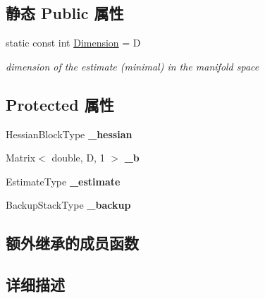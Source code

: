 \subsection*{静态 Public 属性}
\begin{DoxyCompactItemize}
\item 
\hypertarget{classg2o_1_1BaseVertex_a9a831bfdf84cfe625d8f942bc4f1c2d1}{static const int \hyperlink{classg2o_1_1BaseVertex_a9a831bfdf84cfe625d8f942bc4f1c2d1}{Dimension} = D}\label{classg2o_1_1BaseVertex_a9a831bfdf84cfe625d8f942bc4f1c2d1}

\begin{DoxyCompactList}\small\item\em dimension of the estimate (minimal) in the manifold space \end{DoxyCompactList}\end{DoxyCompactItemize}
\subsection*{Protected 属性}
\begin{DoxyCompactItemize}
\item 
\hypertarget{classg2o_1_1BaseVertex_afaf73b0e874db76655d90bdb2f156c00}{Hessian\-Block\-Type {\bfseries \-\_\-hessian}}\label{classg2o_1_1BaseVertex_afaf73b0e874db76655d90bdb2f156c00}

\item 
\hypertarget{classg2o_1_1BaseVertex_a70c672f2997275927efa49c1f5b18ac3}{Matrix$<$ double, D, 1 $>$ {\bfseries \-\_\-b}}\label{classg2o_1_1BaseVertex_a70c672f2997275927efa49c1f5b18ac3}

\item 
\hypertarget{classg2o_1_1BaseVertex_ab188c92c3e906c6e06507ae624c0e7ac}{Estimate\-Type {\bfseries \-\_\-estimate}}\label{classg2o_1_1BaseVertex_ab188c92c3e906c6e06507ae624c0e7ac}

\item 
\hypertarget{classg2o_1_1BaseVertex_a936082916993857a77c8318bc3e59d23}{Backup\-Stack\-Type {\bfseries \-\_\-backup}}\label{classg2o_1_1BaseVertex_a936082916993857a77c8318bc3e59d23}

\end{DoxyCompactItemize}
\subsection*{额外继承的成员函数}


\subsection{详细描述}
